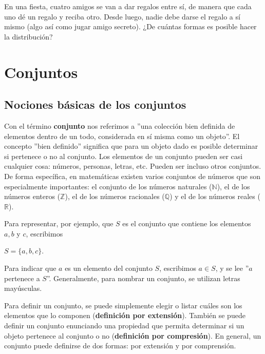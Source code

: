 \begin{ejercicio}
    En una fiesta, cuatro amigos se van a dar regalos entre sí, de manera que cada uno dé un regalo y reciba otro. Desde luego, nadie debe darse el regalo a sí mismo (algo así como jugar amigo secreto). ¿De cuántas formas es posible hacer la distribución?
\end{ejercicio}

\section{Conjuntos}

\subsection{Nociones básicas de los conjuntos}

\begin{definicion}
    Con el término \textbf{conjunto} nos referimos a ''una colección bien definida de elementos dentro de un todo, considerada en sí misma como un objeto''. El concepto ''bien definido'' significa que para un objeto dado es posible determinar si pertenece o no al conjunto. Los elementos de un conjunto pueden ser casi cualquier cosa: números, personas, letras, etc. Pueden ser incluso otros conjuntos. De forma específica, en matemáticas existen varios conjuntos de números que son especialmente importantes: el conjunto de los números naturales ($\mathbb{N}$), el de los números enteros ($\mathbb{Z}$), el de los números racionales ($\mathbb{Q}$) y el de los números reales ($\mathbb{R}$).
\end{definicion}

Para representar, por ejemplo, que $S$ es el conjunto que contiene los elementos $a, b$ y $c$, escribimos

\begin{center}
    $S=\{a,b,c\}$.
\end{center}

Para indicar que $a$ es un elemento del conjunto $S$, escribimos $a \in S$, y se lee ''$a$ pertenece a $S$''. Generalmente, para nombrar un conjunto, se utilizan letras mayúsculas.

Para definir un conjunto, se puede simplemente elegir o listar cuáles son los elementos que lo componen (\textbf{definición por extensión}). También se puede definir un conjunto enunciando una propiedad que permita determinar si un objeto pertenece al conjunto o no (\textbf{definición por compresión}). En general, un conjunto puede definirse de dos formas:  por extensión y por comprensión.

